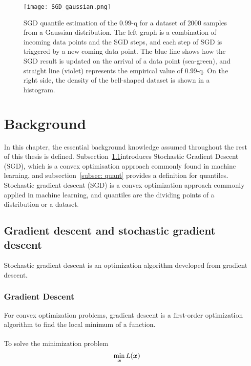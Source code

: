 \begin{figure*}[h!]
	\texttt{[image: SGD\_gaussian.png]}
    \caption{SGD quantile estimation of the $0.99$-q for a dataset of 2000 samples from a Gaussian distribution. The left graph is a combination of incoming data points and the SGD steps, and each step of SGD is triggered by a new coming data point. The blue line shows how the SGD result is updated on the arrival of a data point (sea-green), and straight line (violet) represents the empirical value of $0.99$-q. On the right side, the density of the bell-shaped dataset is shown in a histogram.}
    \label{fig: SGD_quant}
\end{figure*}


\section{Background}

In this chapter, the essential background knowledge assumed throughout the rest of this thesis is defined. Subsection~\ref{subsec: sgd}introduces Stochastic Gradient Descent (SGD), which is a convex optimisation approach commonly found in machine learning, and subsection~\ref{subsec: quant} provides a definition for quantiles.
Stochastic gradient descent (SGD) is a convex optimization approach commonly applied in machine learning, and quantiles are the dividing points of a distribution or a dataset.

    \subsection{Gradient descent and stochastic gradient descent}
    \label{subsec: sgd}
    Stochastic gradient descent is an optimization algorithm developed from gradient descent. 

    \subsubsection{Gradient Descent}
        For convex optimization problems, gradient descent is a first-order optimization algorithm 
        to find the local minimum of a function.
        \\\\
        To solve the minimization problem 
        \begin{equation}
            \min_{\bm{x}} L(\bm{x}) 
        \end{equation} 
        
